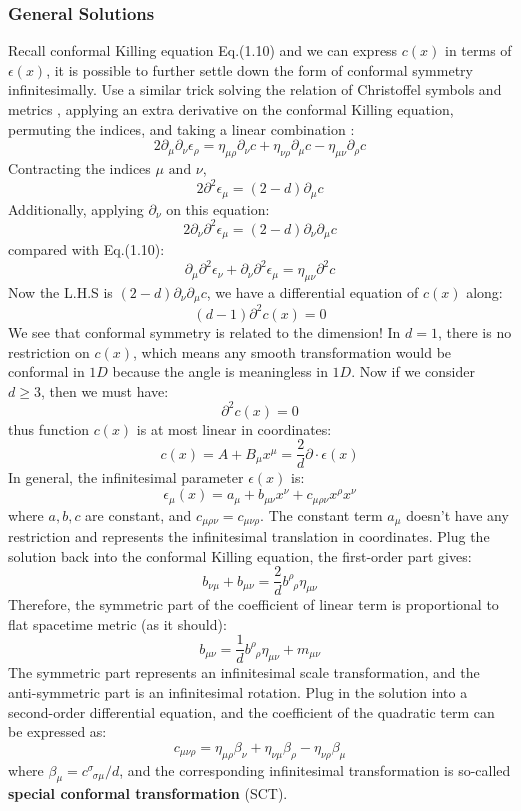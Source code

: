 \documentclass[12pt]{article}
\numberwithin{equation}{section}
\newcommand\<\langle
\renewcommand\>\rangle
\renewcommand\.{\cdot}
\begin{document}
\subsubsection*{General Solutions}
Recall conformal Killing equation Eq.(1.10) and we can express $c(x)$ in terms of $\epsilon(x)$, it is possible to further settle down the form of conformal symmetry infinitesimally. Use a similar trick solving the relation of Christoffel symbols and metrics \cite{Carroll_2019}, applying an extra derivative on the conformal Killing equation, permuting the indices, and taking a linear combination \cite{DiFrancesco:1997nk}:
\[
    2\partial_{\mu}\partial_{\nu}\epsilon_{\rho} = \eta_{\mu\rho}\partial_{\nu}c+\eta_{\nu\rho}\partial_{\mu}c-\eta_{\mu\nu}\partial_{\rho}c
\]
Contracting the indices $\mu\text{ and }\nu$,
\[
    2\partial^2\epsilon_{\mu} = (2-d)\partial_{\mu}c
\]
Additionally, applying $\partial_{\nu}$ on this equation:
\[
    2\partial_{\nu}\partial^2\epsilon_{\mu} = (2-d)\partial_{\nu}\partial_{\mu}c
\]
compared with Eq.(1.10):
\[
    \partial_{\mu}\partial^2\epsilon_{\nu}+\partial_{\nu}\partial^2\epsilon_{\mu} = \eta_{\mu\nu}\partial^2c
\]
Now the L.H.S is $(2-d)\partial_{\nu}\partial_{\mu}c$, we have a differential equation of $c(x)$ along:
\[
    (d-1)\partial^2c(x) = 0
\]
We see that conformal symmetry is related to the dimension! In $d=1$, there is no restriction on $c(x)$, which means any smooth transformation would be conformal in $1D$ because the angle is meaningless in $1D$. Now if we consider $d\ge3$, then we must have:
\[
    \partial^2c(x) = 0
\]
thus function $c(x)$ is at most linear in coordinates:
\[
    c(x) = A + B_{\mu}x^{\mu} = \frac{2}{d}\partial\cdot\epsilon(x)
\]
In general, the infinitesimal parameter $\epsilon(x)$ is:
\[
    \epsilon_{\mu}(x) = a_{\mu} + b_{\mu\nu}x^{\nu}+c_{\mu\rho\nu}x^{\rho}x^{\nu}
\]
where $a,b,c$ are constant, and $c_{\mu\rho\nu} = c_{\mu\nu\rho}$. The constant term $a_{\mu}$ doesn't have any restriction and represents the infinitesimal translation in coordinates. Plug the solution back into the conformal Killing equation, the first-order part gives:
\[
    b_{\nu\mu}+b_{\mu\nu} = \frac{2}{d}b^{\rho}_{\,\,\,\rho}\eta_{\mu\nu}
\]
Therefore, the symmetric part of the coefficient of linear term is proportional to flat spacetime metric (as it should):
\[
    b_{\mu\nu} = \frac{1}{d}b^{\rho}_{\,\,\,\rho}\eta_{\mu\nu} + m_{\mu\nu}
\]
The symmetric part represents an infinitesimal scale transformation, and the anti-symmetric part is an infinitesimal rotation. Plug in the solution into a second-order differential equation, and the coefficient of the quadratic term can be expressed as:
\[
    c_{\mu\nu\rho} = \eta_{\mu\rho}\beta_{\nu}+\eta_{\nu\mu}\beta_{\rho}-\eta_{\nu\rho}\beta_{\mu}
\]
where $\beta_{\mu} = c^{\sigma}_{\,\,\,\sigma\mu}/d$, and the corresponding infinitesimal transformation is so-called \textbf{special conformal transformation} (SCT).
\end{document}
